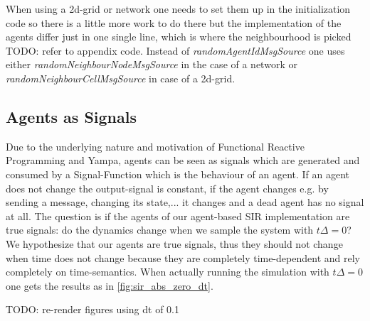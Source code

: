 When using a 2d-grid or network one needs to set them up in the initialization code so there is a little more work to do there but the implementation of the agents differ just in one single line, which is where the neighbourhood is picked TODO: refer to appendix code. Instead of \textit{randomAgentIdMsgSource} one uses either \textit{randomNeighbourNodeMsgSource} in the case of a network or \textit{randomNeighbourCellMsgSource} in case of a 2d-grid.

\subsection{Agents as Signals}
Due to the underlying nature and motivation of Functional Reactive Programming and Yampa, agents can be seen as signals which are generated and consumed by a Signal-Function which is the behaviour of an agent.  If an agent does not change the output-signal is constant, if the agent changes e.g. by sending a message, changing its state,... it changes and a dead agent has no signal at all.
The question is if the agents of our agent-based SIR implementation are true signals: do the dynamics change when we sample the system with $t\Delta = 0$? We hypothesize that our agents are true signals, thus they should not change when time does not change because they are completely time-dependent and rely completely on time-semantics. When actually running the simulation with $t\Delta = 0$ one gets the results as in \ref{fig:sir_abs_zero_dt}.

TODO: re-render figures using dt of 0.1

